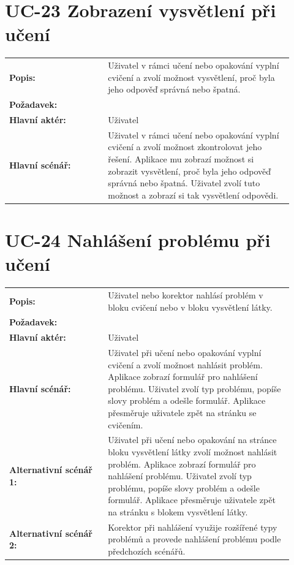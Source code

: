 \section{UC-23 Zobrazení vysvětlení při učení}\label{sec:uc-23}

\begin{tabular}{p{0.32\linewidth}p{0.6\linewidth}}
  \textbf{Popis:} & Uživatel v rámci učení nebo opakování vyplní cvičení a zvolí možnost vysvětlení, proč byla jeho odpověď správná nebo špatná. \\
  \textbf{Požadavek:} & \nameref{sec:fp-answer-explanation} \\
  \textbf{Hlavní aktér:} & Uživatel \\
  \textbf{Hlavní scénář:} & Uživatel v rámci učení nebo opakování vyplní cvičení a zvolí možnost zkontrolovat jeho řešení. Aplikace mu zobrazí možnost si zobrazit vysvětlení, proč byla jeho odpověď správná nebo špatná. Uživatel zvolí tuto možnost a zobrazí si tak vysvětlení odpovědi.\\
\end{tabular}

\section{UC-24 Nahlášení problému při učení}\label{sec:uc-24}

\begin{tabular}{p{0.32\linewidth}p{0.6\linewidth}}
  \textbf{Popis:} & Uživatel nebo korektor nahlásí problém v bloku cvičení nebo v bloku vysvětlení látky. \\
  \textbf{Požadavek:} & \nameref{sec:fp-report-learning-issue} \\
  \textbf{Hlavní aktér:} & Uživatel \\
  \textbf{Hlavní scénář:} & Uživatel při učení nebo opakování vyplní cvičení a zvolí možnost nahlásit problém. Aplikace zobrazí formulář pro nahlášení problému. Uživatel zvolí typ problému, popíše slovy problém a odešle formulář. Aplikace přesměruje uživatele zpět na stránku se cvičením. \\
  \textbf{Alternativní scénář 1:} & Uživatel při učení nebo opakování na stránce bloku vysvětlení látky zvolí možnost nahlásit problém. Aplikace zobrazí formulář pro nahlášení problému. Uživatel zvolí typ problému, popíše slovy problém a odešle formulář. Aplikace přesměruje uživatele zpět na stránku s blokem vysvětlení látky. \\
  \textbf{Alternativní scénář 2:} & Korektor při nahlášení využije rozšířené typy problémů a provede nahlášení problému podle předchozích scénářů. \\
\end{tabular}

